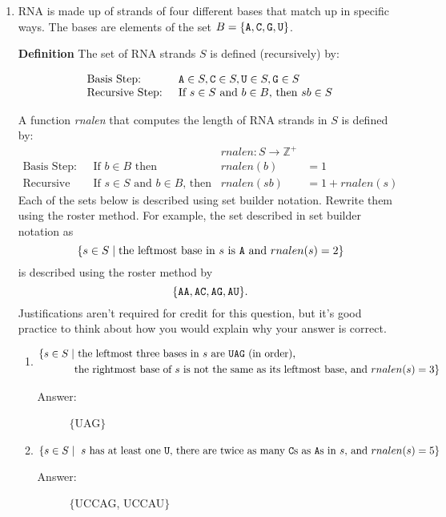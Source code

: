 \documentclass[12pt, oneside]{article}
\begin{document}
\begin{enumerate}
\item RNA is made up of strands of four different bases that match up in
specific ways. The bases are elements of the set 
$B  = \{\texttt{A}, \texttt{C}, \texttt{G}, \texttt{U} \}$.

\label{roster_RNA}

{\bf Definition} The set of RNA strands $S$ is defined (recursively) by:

\[
\begin{array}{ll}
\textrm{Basis Step: } & \texttt{A} \in S, \texttt{C} \in S, \texttt{U} \in S, \texttt{G} \in S \\
\textrm{Recursive Step: } & \textrm{If } s \in S\textrm{ and }b \in B \textrm{, then }sb \in S
\end{array}
\]

A function \textit{rnalen} that computes the length of RNA strands in $S$ is defined by:
\[
\begin{array}{llll}
& & \textit{rnalen}:S\to \mathbb{Z}^+ \\
\textrm{Basis Step:} & \textrm{If } b \in B\textrm{ then } & \textit{rnalen}(b) & = 1 \\
\textrm{Recursive Step:} & \textrm{If } s \in S\textrm{ and }b \in B\textrm{, then  } & \textit{rnalen}(sb) & = 1 + \textit{rnalen}(s)
\end{array}
\]Each of the sets below is described using set builder notation.  Rewrite them using the roster method.
For example, the set described in set builder notation as
\[
\{ s \in S \mid \text{the leftmost base in $s$ is $\texttt{A}$ and $rnalen(s) = 2$} \} 
\]
is described using the roster method by
\[
\{ \texttt{A}\texttt{A} , \texttt{A}\texttt{C} , \texttt{A}\texttt{G}, \texttt{A}\texttt{U}\}.
\]
Justifications aren't required for credit for this question,
but it's good practice to think about how you would explain why your answer is correct.

\begin{enumerate}
\item \begin{align*}
\{ s \in S \mid &\text{ the leftmost three bases in $s$ are $\texttt{U}\texttt{A}\texttt{G}$ (in order),}\\
&\text{the rightmost base of $s$ is not the same as its leftmost base, and $rnalen(s) = 3$} \}
\end{align*}

\begin{description}
    \item[Answer:] $\{$UAG$\}$
\end{description}

\item 
\[
\{ s \in S \mid \text{ $s$ has at least one $\texttt{U}$, there are twice as many $\texttt{C}$s as $\texttt{A}$s in $s$, and $rnalen(s) = 5$} \}
\]
\begin{description}
    \item[Answer:] $\{$UCCAG, UCCAU$\}$
\end{description}
\end{enumerate}


\end{enumerate}
\end{document}
